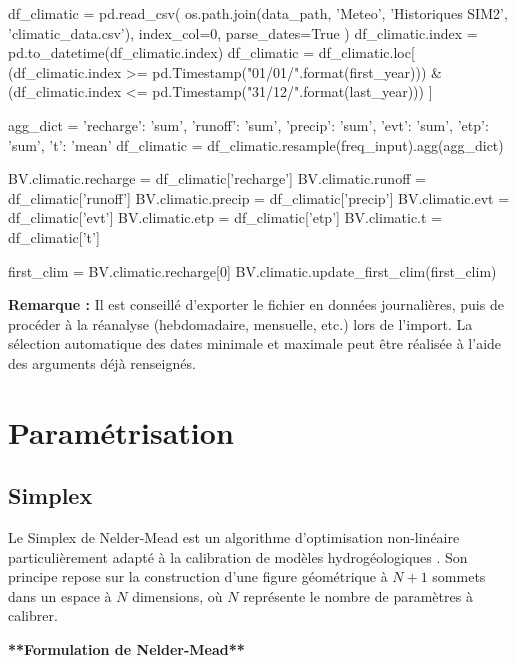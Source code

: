 \begin{pythoncode}[]
df_climatic = pd.read_csv(
    os.path.join(data_path, 'Meteo', 'Historiques SIM2', 'climatic_data.csv'),
    index_col=0, parse_dates=True
)
df_climatic.index = pd.to_datetime(df_climatic.index)
df_climatic = df_climatic.loc[
    (df_climatic.index >= pd.Timestamp("01/01/{}".format(first_year))) &
    (df_climatic.index <= pd.Timestamp("31/12/{}".format(last_year)))
]

agg_dict = {
    'recharge': 'sum',
    'runoff': 'sum',
    'precip': 'sum',
    'evt': 'sum',
    'etp': 'sum',
    't': 'mean'
}
df_climatic = df_climatic.resample(freq_input).agg(agg_dict)

BV.climatic.recharge = df_climatic['recharge']
BV.climatic.runoff = df_climatic['runoff']
BV.climatic.precip = df_climatic['precip']
BV.climatic.evt = df_climatic['evt']
BV.climatic.etp = df_climatic['etp']
BV.climatic.t = df_climatic['t']

first_clim = BV.climatic.recharge[0]
BV.climatic.update_first_clim(first_clim)
\end{pythoncode}

\begin{TipBox}
    \textbf{Remarque :} Il est conseillé d’exporter le fichier en données journalières, puis de procéder à la réanalyse (hebdomadaire, mensuelle, etc.) lors de l’import. La sélection automatique des dates minimale et maximale peut être réalisée à l’aide des arguments déjà renseignés.
\end{TipBox}

\section{Paramétrisation}
\label{sec:parametrisation}

\subsection{Simplex}
\label{sec:simplex}

Le Simplex de Nelder-Mead est un algorithme d'optimisation non-linéaire particulièrement adapté à la calibration de modèles hydrogéologiques \parencite{gao_implementing_2012}. Son principe repose sur la construction d'une figure géométrique à \(N+1\) sommets dans un espace à \(N\) dimensions, où \(N\) représente le nombre de paramètres à calibrer.

\vspace{2em}
\noindent\textbf{**Formulation de Nelder-Mead**}\\

